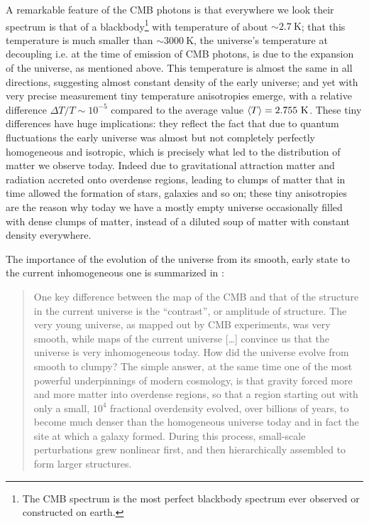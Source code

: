 A remarkable feature of the CMB photons is that everywhere we look their spectrum is that of a blackbody\footnote{The CMB spectrum is the most perfect blackbody spectrum ever observed or constructed on earth.} with temperature of about $\sim 2.7 \ \mathrm{K}$; that this temperature is much smaller than $\sim 3000 \ \mathrm{K}$, the universe's temperature at decoupling i.e. at the time of emission of CMB photons, is due to the expansion of the universe, as mentioned above.
This temperature is almost the same in all directions, suggesting almost constant density of the early universe; and yet with very precise measurement tiny temperature anisotropies emerge, with a relative difference $\Delta T/T\sim 10^{-5}$ compared to the average value $\expval{T}= 2.755 \ \mathrm{K}$. These tiny differences have huge implications: they reflect the fact that due to quantum fluctuations the early universe was almost but not completely perfectly homogeneous and isotropic, which is precisely what led to the distribution of matter we observe today. Indeed due to gravitational attraction matter and radiation accreted onto overdense regions, leading to clumps of matter that in time allowed the formation of stars, galaxies and so on; these tiny anisotropies are the reason why today we have a mostly empty universe occasionally filled with dense clumps of matter, instead of a diluted soup of matter with constant density everywhere.

The importance of the evolution of the universe from its smooth, early state to the current inhomogeneous one is summarized in \cite{modern_cosmology}:
\begin{quote}
One key difference between the map of the CMB and that of the structure in the current universe is the ``contrast'', or amplitude of structure. The very young universe, as mapped out by CMB experiments, was very smooth, while maps of the current universe [\dots] convince us that the universe is very inhomogeneous today. How did the universe evolve from smooth to clumpy? The simple answer, at the same time one of the most powerful underpinnings of modern cosmology, is that gravity forced more and more matter into overdense regions, so that a region starting out with only a small, $10^4$ fractional overdensity evolved, over billions of years, to become much denser than the homogeneous universe today and in fact the site at which a galaxy formed. During this process, small-scale perturbations grew nonlinear first, and then hierarchically assembled to form larger structures.
\end{quote}

